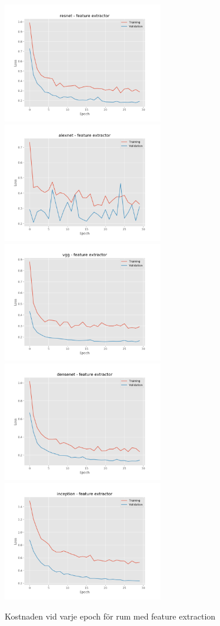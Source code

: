 \documentclass[]{kththesis}
\begin{document}
  \begin{figure}[h]
    \includegraphics[width=7cm]{r_l_resnet_fe}
    \includegraphics[width=7cm]{r_l_alexnet_fe}
    \includegraphics[width=7cm]{r_l_vgg_fe}
    \includegraphics[width=7cm]{r_l_densenet_fe}
    \includegraphics[width=7cm]{r_l_inception_fe}
    \caption{Kostnaden vid varje epoch för rum med feature extraction}
    \label{fig:r_l_1}
  \end{figure}
  
\end{document}
